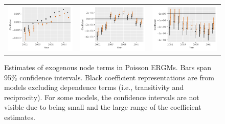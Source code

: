 \documentclass[reqno,onecolumn,letterpaper,12pt]{article}
\begin{document}
\begin{figure}[!h]
\begin{tabular}{@{\hskip -.05cm}c@{\hskip -.2cm}c@{\hskip -.2cm}c}
\includegraphics[height=.165\textheight, clip=true, trim=.5cm .5cm 0cm .1cm]{figures/main_rl_plots/Origin_GDPpc.pdf}   &
\includegraphics[height=.165\textheight, clip=true, trim=.5cm .5cm 0cm .1cm]{figures/main_rl_plots/Dest_TO.pdf} &
\includegraphics[height=.165\textheight, clip=true, trim=.5cm .5cm 0cm .1cm]{figures/main_rl_plots/Origin_TO.pdf}   \\


\end{tabular}
\caption{\label{fig:node_controls} Estimates of exogenous node terms in Poisson ERGMs. Bars span 95\% confidence intervals. Black coefficient representations are from models excluding dependence terms (i.e., transitivity and reciprocity). For some models, the confidence intervals are not visible due to being small and the large range of the coefficient estimates.}
\end{figure}
\end{document}
